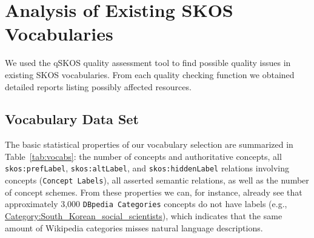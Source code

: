 
\section{Analysis of Existing SKOS Vocabularies}\label{sec:analysis}

We used the qSKOS quality assessment tool to find possible quality issues in existing SKOS vocabularies. From each quality checking function we obtained detailed reports listing possibly affected resources.

\subsection{Vocabulary Data Set}

The basic statistical properties of our vocabulary selection are summarized in Table~\ref{tab:vocabs}: the number of concepts and authoritative concepts, all \texttt{skos:prefLabel}, \texttt{skos:altLabel}, and \texttt{skos:hiddenLabel} relations involving concepts (\texttt{Concept Labels}), all asserted semantic relations, as well as the number of concept schemes. From these properties we can, for instance, already see that approximately 3,000 \texttt{DBpedia Categories} concepts do not have labels (e.g., \url{Category:South_Korean_social_scientists}), which indicates that the same amount of Wikipedia categories misses natural language descriptions.

